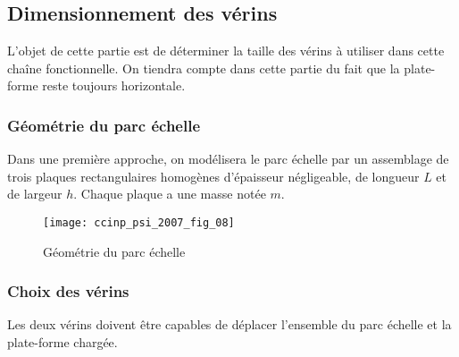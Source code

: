 \ifprof
\begin{corrige}
\end{corrige}
\else
\fi

\subsection{Dimensionnement des vérins}
 L’objet de cette partie est de déterminer la taille des vérins à utiliser dans cette chaîne fonctionnelle.
 On tiendra compte dans cette partie du fait que la plate-forme reste toujours horizontale.

\subsubsection{Géométrie du parc échelle}
Dans une première approche, on modélisera le parc échelle par un assemblage de trois plaques
 rectangulaires homogènes d’épaisseur négligeable, de longueur $L$ et de largeur $h$.
 Chaque plaque a une masse notée $m$.
 
 \begin{figure}[H]
\centering
\texttt{[image: ccinp\_psi\_2007\_fig\_08]}
\caption{\label{ccinp_psi_2007_fig_08} Géométrie du parc échelle}
\end{figure}



\ifprof
\begin{corrige}
\end{corrige}
\else
\fi

\subsubsection{Choix des vérins}
Les deux vérins doivent être capables de déplacer l’ensemble du parc échelle et la plate-forme
 chargée.


